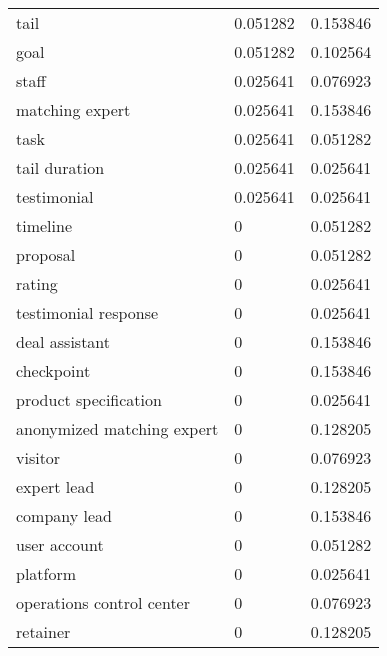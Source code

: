 \begin{longtable}{@{}lll@{}}
tail                       & 0.051282            & 0.153846             \\
goal                       & 0.051282            & 0.102564             \\
staff                      & 0.025641            & 0.076923             \\
matching expert            & 0.025641            & 0.153846             \\
task                       & 0.025641            & 0.051282             \\
tail duration              & 0.025641            & 0.025641             \\
testimonial                & 0.025641            & 0.025641             \\
timeline                   & 0                   & 0.051282             \\
proposal                   & 0                   & 0.051282             \\
rating                     & 0                   & 0.025641             \\
testimonial response       & 0                   & 0.025641             \\
deal assistant             & 0                   & 0.153846             \\
checkpoint                 & 0                   & 0.153846             \\
product specification      & 0                   & 0.025641             \\
anonymized matching expert & 0                   & 0.128205             \\
visitor                    & 0                   & 0.076923             \\
expert lead                & 0                   & 0.128205             \\
company lead               & 0                   & 0.153846             \\
user account               & 0                   & 0.051282             \\
platform                   & 0                   & 0.025641             \\
operations control center  & 0                   & 0.076923             \\
retainer                   & 0                   & 0.128205             \\* \bottomrule
\end{longtable}


